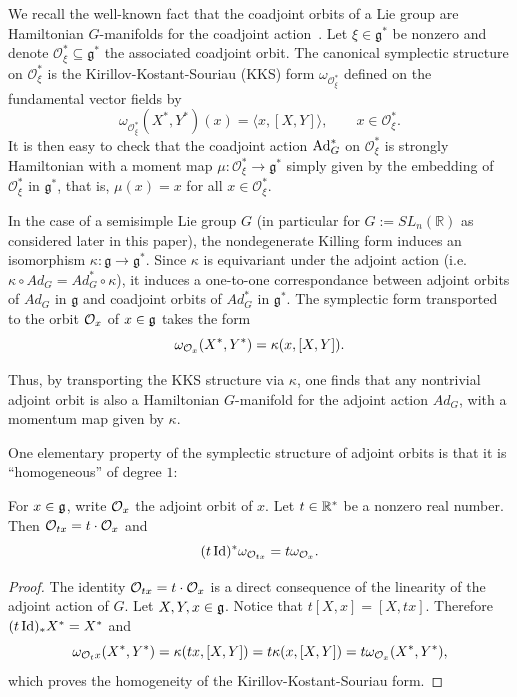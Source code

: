 \documentclass[english]{article}
\begin{document}
We recall the well-known fact that the coadjoint orbits of a Lie group are Hamiltonian $G$-manifolds for the coadjoint action~\cite{KirillovOrbitMethod}. Let $\xi\in \mathfrak{g}^*$ be nonzero and denote $\mathcal{O}^*_\xi\subseteq \mathfrak{g}^*$ the associated coadjoint orbit. The canonical symplectic structure on $\mathcal{O}^*_\xi$ is the Kirillov-Kostant-Souriau (KKS) form $\omega_{\mathcal{O}^*_\xi}$ defined on the fundamental vector fields by
\begin{equation*}
    \omega_{\mathcal{O}^*_\xi}(X^*, Y^*)(x)=\langle x, [X, Y]\rangle, \qquad x\in \mathcal{O}^*_\xi.
\end{equation*}
It is then easy to check that the coadjoint action $\operatorname{Ad}_G^*$ on $\mathcal{O}^*_\xi$ is strongly Hamiltonian with a moment map $\mu: \mathcal{O}^*_\xi\to \mathfrak{g}^*$ simply given by the embedding of $\mathcal{O}^*_\xi$ in $\mathfrak{g}^*$, that is, $\mu(x)=x$ for all $x\in \mathcal{O}^*_\xi$.

In the case of a semisimple Lie group $G$ (in particular for $G:=SL_n(\mathbb{R}) $ as considered later in this paper), the nondegenerate Killing form induces an isomorphism $\kappa: \mathfrak{g}\to \mathfrak{g}^* $. 
Since $\kappa$ is equivariant under the adjoint action (i.e. $\kappa\circ Ad_G=Ad^*_G \circ \kappa$), it induces a one-to-one correspondance between adjoint orbits of $Ad_G$ in $\mathfrak{g}$ and coadjoint orbits of $Ad_G^*$ in $\mathfrak{g}^*$. 
The symplectic form transported to the orbit $\mathcal{O}_x$ of $x\in \mathfrak g$ takes the form
\begin{equation}\label{eqn: KKS_adjoint_orbits}
    \omega_{\mathcal{O}_x} (X^*, Y^*) = \kappa(x, [X, Y]). 
\end{equation}
   
Thus, by transporting the KKS structure via $\kappa$, one finds that any nontrivial adjoint orbit is also a Hamiltonian $G$-manifold for the adjoint action $Ad_G$, with a momentum map given by $\kappa$. 

One elementary property of the symplectic structure of adjoint orbits is that it is \enquote{homogeneous} of degree $1$:
\begin{proposition} 
\label{propno:KKSHomogene}
    For $x\in \mathfrak g$, write $\mathcal{O}_x$ the adjoint orbit of $x$.
    Let $t\in \mathbb{R}^*$ be a nonzero real number.
    Then $\mathcal{O}_{tx} = t\cdot \mathcal{O}_x$ and 
    \[
        (t\operatorname{Id})^* \omega_{\mathcal{O}_{tx}} = t \omega_{\mathcal{O}_x}
    .\]
\end{proposition}
\begin{proof}
    The identity $\mathcal{O}_{tx} = t\cdot \mathcal{O}_x$ is a direct consequence of the linearity of the adjoint action of $G$.
    Let $X, Y, x \in \mathfrak g$. Notice that $t[X, x] = [X, tx]$. Therefore $(t\operatorname{Id})_*X^* = X^*$ and
    \[
        \omega_{\mathcal{O}_tx} (X^*, Y^*) = \kappa(tx, [X,Y]) = t \kappa(x, [X,Y]) = t\omega_{\mathcal{O}_x}(X^*, Y^*) 
    ,\]
    which proves the homogeneity of the Kirillov-Kostant-Souriau form. 
\end{proof}
\end{document}
